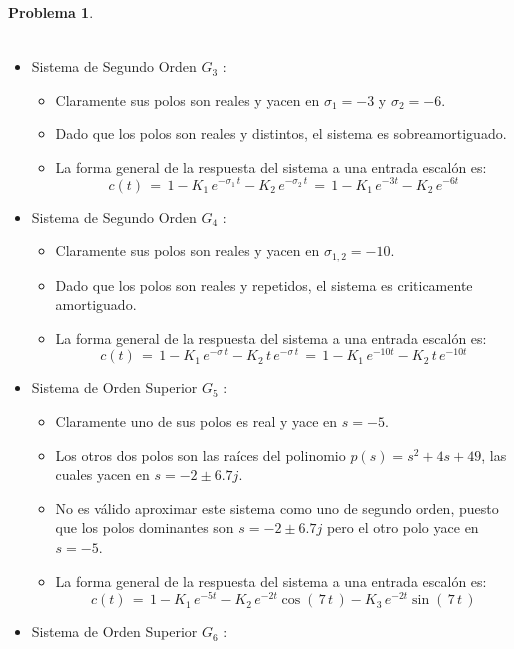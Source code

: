 \documentclass[ a4paper, twoside, 11pt]{article}
\theoremstyle{definition}
\newtheorem{problem}[definition]{Problema}
\begin{document}
\begin{problem}
\begin{itemize}
\begin{itemize}
\begin{align*}
\end{align*}
\end{itemize}
\item Sistema de Segundo Orden $G_3$ : 
\begin{itemize}
\item Claramente sus polos son reales y yacen en $\sigma_1 = -3$ y $\sigma_2 = -6$. 
\item Dado que los polos son reales y distintos, el sistema es sobreamortiguado. 
\item La forma general de la respuesta del sistema a una entrada escal\'on es: 
\[
c(t) \, 
= \, 1 - K_1 \, e^{ - \sigma_1 \, t } - K_2 \, e^{ - \sigma_2 \, t } \, 
= \, 1 - K_1 \, e^{ -3t } - K_2 \, e^{ -6t }
\]
\end{itemize}
\item Sistema de Segundo Orden $G_4$ : 
\begin{itemize}
\item Claramente sus polos son reales y yacen en $\sigma_{1,2} = -10$. 
\item Dado que los polos son reales y repetidos, el sistema es criticamente amortiguado. 
\item La forma general de la respuesta del sistema a una entrada escal\'on es: 
\[
c(t) \, 
= \, 1 - K_1 \, e^{ - \sigma \, t } - K_2 \, t \, e^{ - \sigma \, t } \, 
= \, 1 - K_1 \, e^{ -10t } - K_2 \, t \, e^{ -10t }
\]
\end{itemize}
\newpage
\item Sistema de Orden Superior $G_5$ : 
\begin{itemize}
\item Claramente uno de sus polos es real y yace en $s = -5$. 
\item Los otros dos polos son las ra\'ices del polinomio $p(s) = s^2 + 4s + 49$, las cuales yacen en $s = -2 \pm 6.7j$. 
\item No es v\'alido aproximar este sistema como uno de segundo orden, puesto que los polos dominantes son $s = -2 \pm 6.7j$ pero el otro polo yace en $s = -5$. 
\item La forma general de la respuesta del sistema a una entrada escal\'on es: 
\[
c(t) \, = \, 1 - K_1 \, e^{ -5t } - K_2 \, e^{ -2t } \cos( \, 7 \, t \, ) - K_3 \, e^{ -2t } \sin( \, 7 \, t \, ) 
\]
\end{itemize}
\item Sistema de Orden Superior $G_6$ : 

\end{itemize}
\end{problem}
\end{document}
